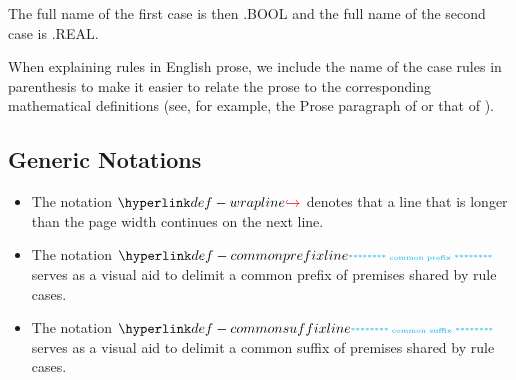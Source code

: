 The full name of the first case is then .BOOL
and the full name of the second case is .REAL.

When explaining rules in English prose, we include the name of the case rules
in parenthesis to make it easier to relate the prose to the corresponding mathematical
definitions (see, for example, the Prose paragraph of 
or that of ).

\subsection{Generic Notations}
\hypertarget{def-wrapline}{}
\begin{itemize}
\item
The notation $\wrappedline$ denotes that a line that is longer than the page width continues on the next line.

\hypertarget{def-commonprefixline}{}
\item The notation $\commonprefixline$ serves as a visual aid to delimit a common prefix of premises shared by rule cases.

\hypertarget{def-commonsuffixline}{}
\item The notation $\commonsuffixline$ serves as a visual aid to delimit a common suffix of premises shared by rule cases.
\end{itemize}

